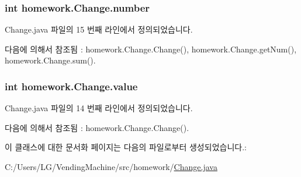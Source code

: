 \subsubsection[{\texorpdfstring{number}{number}}]{\setlength{\rightskip}{0pt plus 5cm}int homework.\+Change.\+number\hspace{0.3cm}{\ttfamily [protected]}}\hypertarget{classhomework_1_1_change_a41ba89697443264b7d754f84c6153888}{}\label{classhomework_1_1_change_a41ba89697443264b7d754f84c6153888}


Change.\+java 파일의 15 번째 라인에서 정의되었습니다.



다음에 의해서 참조됨 \+:  homework.\+Change.\+Change(), homework.\+Change.\+get\+Num(), homework.\+Change.\+sum().

\subsubsection[{\texorpdfstring{value}{value}}]{\setlength{\rightskip}{0pt plus 5cm}int homework.\+Change.\+value\hspace{0.3cm}{\ttfamily [protected]}}\hypertarget{classhomework_1_1_change_a4639252147d1aea40044d63a1d320061}{}\label{classhomework_1_1_change_a4639252147d1aea40044d63a1d320061}


Change.\+java 파일의 14 번째 라인에서 정의되었습니다.



다음에 의해서 참조됨 \+:  homework.\+Change.\+Change().



이 클래스에 대한 문서화 페이지는 다음의 파일로부터 생성되었습니다.\+:\begin{DoxyCompactItemize}
\item 
C\+:/\+Users/\+L\+G/\+Vending\+Machine/src/homework/\hyperlink{_change_8java}{Change.\+java}\end{DoxyCompactItemize}
